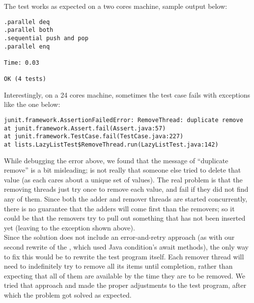 The test works as expected on a two cores machine, sample output below:

\begin{verbatim}
.parallel deq
.parallel both
.sequential push and pop
.parallel enq

Time: 0.03

OK (4 tests)
\end{verbatim}
\hfill

Interestingly, on a 24 cores machine, sometimes the test case
 fails with exceptions like the one below: \\

\begin{verbatim}
junit.framework.AssertionFailedError: RemoveThread: duplicate remove
at junit.framework.Assert.fail(Assert.java:57)
at junit.framework.TestCase.fail(TestCase.java:227)
at lists.LazyListTest$RemoveThread.run(LazyListTest.java:142)
\end{verbatim}
\hfill

While debugging the error above, we found that the message of
``duplicate remove'' is a bit misleading; is not really that someone
else tried to delete that value (as each  cares about
a unique set of values). The real problem is that the removing threads
just try once to remove each value, and fail if they did not find any
of them. Since both the adder and remover threads are started
concurrently, there is no guarantee that the adders will come first
than the removers; so it could be that the removers try to pull out
something that has not been inserted yet (leaving to the exception
shown above). \\

Since the  solution does not include an error-and-retry
approach (as with our second rewrite of the , which
used Java condition's await methods), the only way to fix this would
be to rewrite the test program itself. Each remover thread will need
to indefinitely try to remove all its items until completion, rather
than expecting that all of them are available by the time they are to
be removed. We tried that approach and made the proper adjustments
to the test program, after which the problem got solved as expected.
